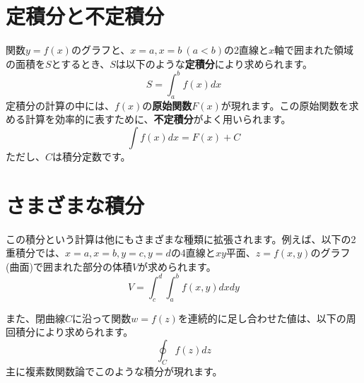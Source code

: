 \documentclass{ltjsarticle}
\begin{document}
\section{定積分と不定積分}

関数$y=f(x)$のグラフと、$x=a, x=b\ (a<b)$の2直線と$x$軸で囲まれた領域の面積を$S$とするとき、$S$は以下のような\textbf{定積分}により求められます。
\[ S = \int_{a}^{b} f(x) dx \]
定積分の計算の中には、$f(x)$の\textbf{原始関数}$F(x)$が現れます。この原始関数を求める計算を効率的に表すために、\textbf{不定積分}がよく用いられます。
\[ \int f(x)dx = F(x) + C \]
ただし、$C$は積分定数です。

\section{さまざまな積分}
この積分という計算は他にもさまざまな種類に拡張されます。例えば、以下の2重積分では、$x=a,x=b, y=c,y=d$の4直線と$xy$平面、$z = f(x,y)$のグラフ(曲面)で囲まれた部分の体積$V$が求められます。
\[ V = \int_{c}^{d} \int_{a}^{b} f(x,y)dxdy \]

また、閉曲線$C$に沿って関数$w=f(z)$を連続的に足し合わせた値は、以下の周回積分により求められます。
\[ \oint_{C} f(z)dz \]
主に複素数関数論でこのような積分が現れます。
\end{document}
